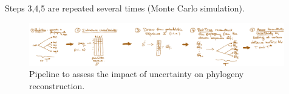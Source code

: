 \documentclass[12pt]{article}
\begin{document}
Steps 3,4,5 are repeated several times (Monte Carlo simulation).

\begin{figure}[H]
\begin{center}
 \includegraphics[width = 0.99\textwidth]{figs/pipeline.png}
\caption{Pipeline to assess the impact of uncertainty on phylogeny reconstruction.}
\label{fig:pipeline}
\end{center}
\end{figure}






\newpage



\end{document}
